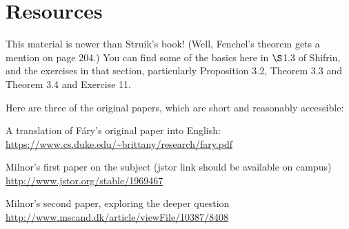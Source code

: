 \documentclass[12pt]{amsart}
\begin{document}
\section*{Resources}

This material is newer than Struik's book! (Well, Fenchel's theorem gets a mention on page 204.) You can find some of the basics here in $\S$1.3 of Shifrin, and the exercises in that section, particularly Proposition 3.2, Theorem 3.3 and Theorem 3.4 and Exercise 11.

Here are three of the original papers, which are short and reasonably accessible:
\begin{compactenum}
\item A translation of F\'{a}ry's original paper into English:
\url{https://www.cs.duke.edu/~brittany/research/fary.pdf}
\item Milnor's first paper on the subject (jstor link should be available on campus)
\url{http://www.jstor.org/stable/1969467}
\item Milnor's second paper, exploring the deeper question
\url{http://www.mscand.dk/article/viewFile/10387/8408}
\end{compactenum}
\end{document}
